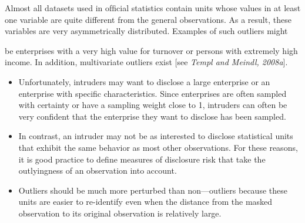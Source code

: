 \documentclass[]{article}
\begin{document}
Almost all datasets used in ofﬁcial statistics contain units whose values in at least
one variable are quite different from the general observations. As a result, these
variables are very asymmetrically distributed. Examples of such outliers might

be enterprises with a very high value for turnover or persons with extremely high
income. In addition, multivariate outliers exist [see \textit{Templ and Meindl, 2008a}].

\begin{itemize}
	\item Unfortunately, intruders may want to disclose a large enterprise or an enterprise
	with speciﬁc characteristics. Since enterprises are often sampled with certainty or
	have a sampling weight close to 1, intruders can often be very conﬁdent that the
	enterprise they want to disclose has been sampled. 
	\item In contrast, an intruder may
	not be as interested to disclose statistical units that exhibit the same behavior as
	most other observations. For these reasons, it is good practice to deﬁne measures
	of disclosure risk that take the outlyingness of an observation into account. 
	\item Outliers should be much more perturbed than
	non—outliers because these units are easier to re-identify even when the distance
	from the masked observation to its original observation is relatively large.
\end{itemize}
\end{document}
